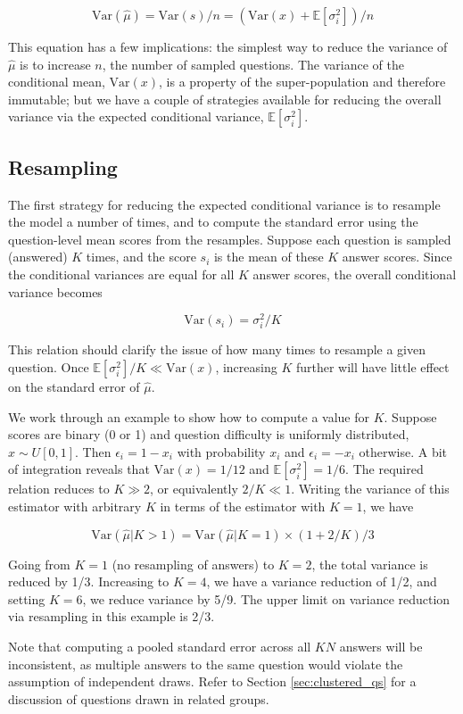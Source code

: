 \documentclass[11pt, oneside]{article}   	%
\newcommand{\E}{\mathbb{E}}
\newcommand{\Var}{\mathrm{Var}}
\begin{document}
\[
\Var(\hat{\mu})=\Var(s)/n=(\Var(x)+\E[\sigma_i^2])/n
\]

This equation has a few implications: the simplest way to reduce the variance of $\hat{\mu}$ is to increase $n$, the number of sampled questions. The variance of the conditional mean, $\Var(x)$, is a property of the super-population and therefore immutable; but we have a couple of strategies available for reducing the overall variance via the expected conditional variance, $\E[\sigma_i^2]$.

\subsection{Resampling}
\label{sec:resampling}

The first strategy for reducing the expected conditional variance is to resample the model a number of times, and to compute the standard error using the question-level mean scores from the resamples. Suppose each question is sampled (answered) $K$ times, and the score $s_i$ is the mean of these $K$ answer scores. Since the conditional variances are equal for all $K$ answer scores, the overall conditional variance becomes

\[
\Var(s_i)=\sigma_i^2/K
\]

This relation should clarify the issue of how many times to resample a given question. Once $\E[\sigma_i^2]/K \ll \Var(x)$, increasing $K$ further will have little effect on the standard error of $\hat{\mu}$.

We work through an example to show how to compute a value for $K$. Suppose scores are binary (0 or 1) and question difficulty is uniformly distributed, $x \sim U[0, 1]$. Then $\epsilon_i = 1-x_i$ with probability $x_i$ and $\epsilon_i=-x_i$ otherwise. A bit of integration reveals that $\Var(x)=1/12$ and $\E[\sigma_i^2]= 1/6$. The required relation reduces to $K\gg2$, or equivalently $2/K\ll1$. Writing the variance of this estimator with arbitrary $K$ in terms of the estimator with $K=1$, we have

\[
\Var(\hat{\mu}|K>1)=\Var(\hat{\mu}|K=1)\times (1+2/K)/3
\]

Going from $K=1$ (no resampling of answers) to $K=2$, the total variance is reduced by 1/3. Increasing to $K=4$, we have a variance reduction of 1/2, and setting $K=6$, we reduce variance by 5/9. The upper limit on variance reduction via resampling in this example is 2/3.

Note that computing a pooled standard error across all $KN$ answers will be inconsistent, as multiple answers to the same question would violate the assumption of independent draws. Refer to Section \ref{sec:clustered_qs} for a discussion of questions drawn in related groups.
\end{document}
